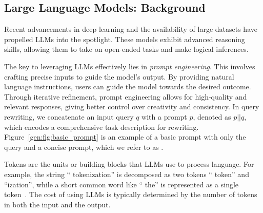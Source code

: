 \subsection{Large Language Models: Background}

Recent advancements in deep learning and the availability of large datasets have propelled LLMs into the spotlight. These models  exhibit advanced reasoning skills, allowing them to take on open-ended tasks and make logical inferences. 

The key to leveraging LLMs effectively lies in \emph{prompt engineering}\cite{googleprompt}. This involves crafting precise inputs to guide the model's output. By providing natural language instructions, users can guide the model towards the desired outcome. Through iterative refinement, prompt engineering allows for high-quality and relevant responses, giving better control over creativity and consistency. In query rewriting, we concatenate an input query $q$ with a prompt $p$, denoted as $p \texttt{||} q$, which encodes a comprehensive task description for rewriting. Figure~\ref{gen:fig:basic_prompt} is an example of a basic prompt with only the query and a concise prompt,  which we refer to as \baseline.

 Tokens are the units or building blocks that LLMs use to process language. For example, the string `` tokenization'' is decomposed as two tokens `` token'' and ``ization'', while a short common word like `` the'' is represented as a single token~\cite{openaitokens}. The cost of using LLMs is typically determined by the number of tokens in both the input and the output.

